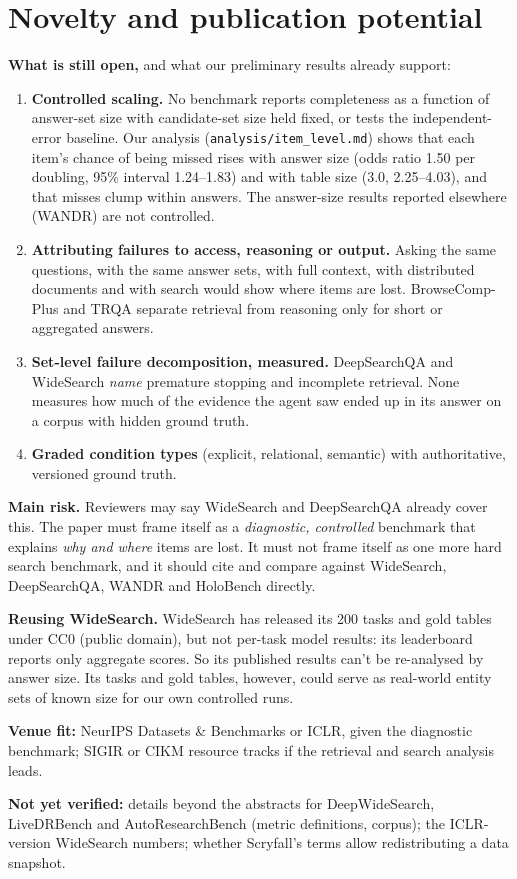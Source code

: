 \documentclass[10pt]{article}
\begin{document}
\section*{Novelty and publication potential}
\textbf{What is still open,} and what our preliminary results already support:
\begin{enumerate}
\item \textbf{Controlled scaling.} No benchmark reports completeness as a function of answer-set size with
candidate-set size held fixed, or tests the independent-error baseline. Our analysis
(\texttt{analysis/item\_level.md}) shows that each item's chance of being missed rises with answer size (odds
ratio 1.50 per doubling, 95\% interval 1.24--1.83) and with table size (3.0, 2.25--4.03), and that misses clump
within answers. The answer-size
results reported elsewhere (WANDR) are not controlled.
\item \textbf{Attributing failures to access, reasoning or output.} Asking the same questions, with the same
answer sets, with full context, with distributed documents and with search would show where items are lost.
BrowseComp-Plus and TRQA separate retrieval from reasoning only for short or aggregated answers.
\item \textbf{Set-level failure decomposition, measured.} DeepSearchQA and WideSearch \emph{name} premature
stopping and incomplete retrieval. None measures how much of the evidence the agent saw ended up in its answer on
a corpus with hidden ground truth.
\item \textbf{Graded condition types} (explicit, relational, semantic) with authoritative, versioned ground truth.
\end{enumerate}

\textbf{Main risk.} Reviewers may say WideSearch and DeepSearchQA already cover this. The paper must frame itself
as a \emph{diagnostic, controlled} benchmark that explains \emph{why and where} items are lost. It must not frame
itself as one more hard search benchmark, and it should cite and compare against WideSearch, DeepSearchQA, WANDR
and HoloBench directly.

\textbf{Reusing WideSearch.} WideSearch has released its 200 tasks and gold tables under CC0 (public domain),
but not per-task model results: its leaderboard reports only aggregate scores. So its published results can't be
re-analysed by answer size. Its tasks and gold tables, however, could serve as real-world entity sets of known
size for our own controlled runs.

\textbf{Venue fit:} NeurIPS Datasets \& Benchmarks or ICLR, given the diagnostic benchmark; SIGIR or CIKM resource
tracks if the retrieval and search analysis leads.

\textbf{Not yet verified:} details beyond the abstracts for DeepWideSearch, LiveDRBench and AutoResearchBench
(metric definitions, corpus); the ICLR-version WideSearch numbers; whether Scryfall's terms allow redistributing a
data snapshot.
\end{document}
